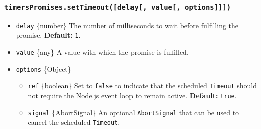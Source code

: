\begin{Shaded}
\begin{Highlighting}[]
\NormalTok{ \{}
\OperatorTok{,}
\OperatorTok{,}
\OperatorTok{,}
\NormalTok{\} }\OperatorTok{=} \NormalTok{(}\NormalTok{)}\OperatorTok{;}
\end{Highlighting}
\end{Shaded}

\subsubsection{\texorpdfstring{\texttt{timersPromises.setTimeout({[}delay{[},\ value{[},\ options{]}{]}{]})}}{timersPromises.setTimeout({[}delay{[}, value{[}, options{]}{]}{]})}}\label{timerspromises.settimeoutdelay-value-options}

\begin{itemize}
\tightlist
\item
  \texttt{delay} \{number\} The number of milliseconds to wait before
  fulfilling the promise. \textbf{Default:} \texttt{1}.
\item
  \texttt{value} \{any\} A value with which the promise is fulfilled.
\item
  \texttt{options} \{Object\}

  \begin{itemize}
  \tightlist
  \item
    \texttt{ref} \{boolean\} Set to \texttt{false} to indicate that the
    scheduled \texttt{Timeout} should not require the Node.js event loop
    to remain active. \textbf{Default:} \texttt{true}.
  \item
    \texttt{signal} \{AbortSignal\} An optional \texttt{AbortSignal}
    that can be used to cancel the scheduled \texttt{Timeout}.
  \end{itemize}
\end{itemize}

\begin{Shaded}
\begin{Highlighting}[]
\NormalTok{ \{}
\OperatorTok{,}
\NormalTok{\} } \OperatorTok{;}

\OperatorTok{=}  \NormalTok{(}\OperatorTok{,} \NormalTok{)}\OperatorTok{;}

\OperatorTok{;}  
\end{Highlighting}
\end{Shaded}

